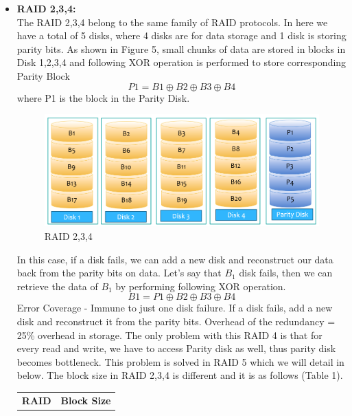 \documentclass[12pt]{article}
\begin{document}
\begin{itemize}
    \item \textbf{RAID 2,3,4:} \\
    The RAID 2,3,4 belong to the same family of RAID protocols. In here we have a total of 5 disks, where 4 disks are for data storage and 1 disk is storing parity bits. As shown in Figure 5, small chunks of data are stored in blocks in Disk 1,2,3,4 and following XOR operation is performed to store corresponding Parity Block
    \begin{equation*}
        P1 = B1 \oplus B2 \oplus B3 \oplus B4
    \end{equation*}
    where P1 is the block in the Parity Disk.
    \begin{figure}
        \centering
        \includegraphics[width=15cm]{Assignment-14/Raid_234.png}
        \caption{RAID 2,3,4}
    \end{figure}
    In this case, if a disk fails, we can add a new disk and reconstruct our data back from the parity bits on data. Let's say that $B_1$ disk fails, then we can retrieve the data of $B_1$ by performing following XOR operation.
    \begin{equation*}
        B1 = P1 \oplus B2 \oplus B3 \oplus B4
    \end{equation*}
    Error Coverage - Immune to just one disk failure. If a disk fails, add a new disk and reconstruct it from the parity bits.
    Overhead of the redundancy = 25\% overhead in storage.
    The only problem with this RAID 4 is that for every read and write, we have to access Parity disk as well, thus parity disk becomes bottleneck. This problem is solved in RAID 5 which we will detail in below. The block size in RAID 2,3,4 is different and it is as follows (Table 1). \\
    \begin{table}
    \centering
    \begin{tabular}{|c|c|} 
    \hline
    \textbf{RAID} & \textbf{Block Size}  \\ 

\end{tabular}
\end{table}
\end{itemize}
\end{document}
